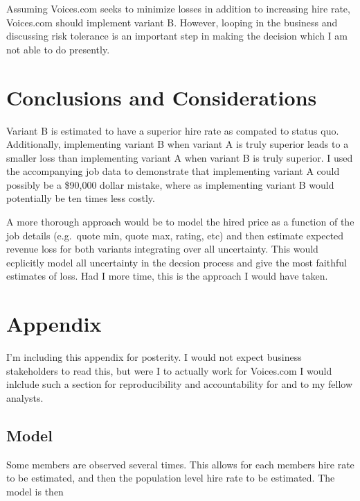 \documentclass[]{article}
\begin{document}
Assuming Voices.com seeks to minimize losses in addition to increasing
hire rate, Voices.com should implement variant B. However, looping in
the business and discussing risk tolerance is an important step in
making the decision which I am not able to do presently.

\hypertarget{conclusions-and-considerations}{%
\section{Conclusions and
Considerations}\label{conclusions-and-considerations}}

Variant B is estimated to have a superior hire rate as compated to
status quo. Additionally, implementing variant B when variant A is truly
superior leads to a smaller loss than implementing variant A when
variant B is truly superior. I used the accompanying job data to
demonstrate that implementing variant A could possibly be a \$90,000
dollar mistake, where as implementing variant B would potentially be ten
times less costly.

A more thorough approach would be to model the hired price as a function
of the job details (e.g.~quote min, quote max, rating, etc) and then
estimate expected revenue loss for both variants integrating over all
uncertainty. This would ecplicitly model all uncertainty in the decsion
process and give the most faithful estimates of loss. Had I more time,
this is the approach I would have taken.

\newpage

\hypertarget{appendix}{%
\section{Appendix}\label{appendix}}

I'm including this appendix for posterity. I would not expect business
stakeholders to read this, but were I to actually work for Voices.com I
would inlclude such a section for reproducibility and accountability for
and to my fellow analysts.

\hypertarget{model}{%
\subsection{Model}\label{model}}

Some members are observed several times. This allows for each members
hire rate to be estimated, and then the population level hire rate to be
estimated. The model is then
\end{document}
